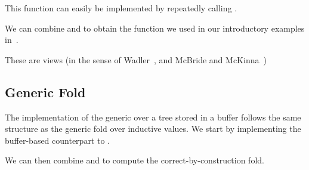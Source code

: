 
This function can easily be implemented by repeatedly calling
.







We can combine  and  to obtain
the  function we used in our introductory examples
in~.








These are views
(in the sense of Wadler~\cite{DBLP:conf/popl/Wadler87},
and McBride and McKinna~\cite{DBLP:journals/jfp/McBrideM04})


\subsection{Generic Fold}

The implementation of the generic  over a tree stored
in a buffer follows the same structure as the generic fold over inductive
values.
%
We start by implementing the buffer-based counterpart to .


We can then combine  and  to compute
the correct-by-construction fold.


